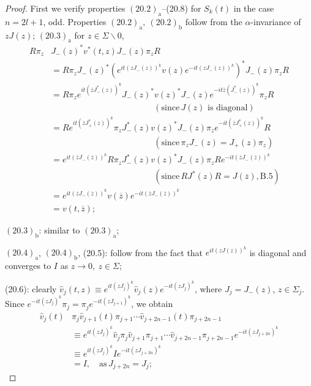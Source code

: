 \documentclass{surv-l}
\theoremstyle{plain}
\theoremstyle{definition}
\numberwithin{equation}{chapter}
\begin{document}
\begin{proof}
First we verify properties $(20.2)_{\mathrm{a}}$--(20.8) for $S_{k}(t)$ in the case $n= 2l+1$, odd. Properties $(20.2)_{\mathrm{a}},\ (20.2)_{\mathrm{b}}$ follow from the $\alpha$-invariance of $zJ(z)$; $(20.3)_{\mathrm{a}}$ for $z\in\Sigma\backslash 0$,
\begin{align*}
R\pi_{z}&J_{-}(z)^{*}v^{*}(t, z)J_{-}(z)\pi_{z}R\\
&=R\pi_{z}J_{-}(z)^{*}(e^{it(zJ_{-}(z))^{k}}v(z)e^{-it(zJ_{-}(z))^{k}})^{*}J_{-}(z)\pi_{z}R\\
&=R\pi_{z}e^{it(\overline{z}J^{*}_{-}(z))^{k}}J_{-}(z)^{*}v(z)^{*}J_{-}(z)e^{-it\overline{z}(J_{-}^{*}(z))^{k}}\pi_{z}R\\
&\qquad\qquad\qquad\qquad\qquad\qquad(\mathrm{since}\, J(z)\text{ is diagonal})\\
&=Re^{it(\overline{z}J_{+}^{*}(z))^{k}}\pi_{z}J_{-}^{*}(z)v(z)^{*}J_{-}(z)\pi_{z}e^{-it(\overline{z}J_{+}^{*}(z))^{k}}R\\
&\qquad\qquad\qquad\qquad\qquad\qquad(\mathrm{since}\, \pi_{z}J_{-}(z)=J_{+}(z)\pi_{z})\\
&=e^{it(\overline{z}J_{-}(\overline{z}))^{k}}R\pi_{z}J_{-}^{*}(z)v(z)^{*}J_{-}(z)\pi_{z}Re^{-it(\overline{z}J_{-}(\overline{z}))^{k}}\\
&\qquad\qquad\qquad\qquad\qquad\qquad(\mathrm{since}\, RJ^{*}(z)R=J(\overline{z}), \mathrm{B}.5)\\
&=e^{it(\overline{z}J_{-}(\overline{z}))^{k}}v(\overline{z})e^{-it(\overline{z}J_{-}(\overline{z}))^{k}}\\
&=v(t,\overline{z});
\end{align*}

$(20.3)_{\mathrm{b}}$: similar to $(20.3)_{\mathrm{a}}$;

$(20.4)_{\mathrm{a}}$, $(20.4)_{\mathrm{b}}$, (20.5): follow from the fact that $e^{it(zJ(z))^{k}}$ is diagonal and converges to $I$ as $z\rightarrow 0,\ z\in\Sigma$;

(20.6): clearly $\hat{v}_{j}(t, z)\equiv e^{it(zJ_{j})^{k}}\hat{v}_{j}(z)e^{-it(zJ_{j})^{k}}$, where $J_{j}=J_{-}(z)$, $z\in\Sigma_{j}$. Since $e^{-it(zJ_{j})^{k}}\pi_{j}=\pi_{j}e^{-it(zJ_{j+1})^{k}}$, we obtain
\begin{align*}
\hat{v}_{j}(t)&\pi_{j}\hat{v}_{j+1}(t)\pi_{j+1}\cdots\hat{v}_{j+2n-1}(t)\pi_{j+2n-1}\\
&\equiv e^{it(zJ_{j})^{k}}\hat{v}_{j}\pi_{j}\hat{v}_{j+1}\pi_{j+1}\cdots\hat{v}_{j+2n-1}\pi_{j+2n-1}e^{-it(zJ_{j+2n})^{k}}\\
&\equiv e^{it(zJ_{j})^{k}}Ie^{-it(zJ_{j+2n})^{k}}\\
&=I,\quad \mathrm{as}\, J_{j+2n}=J_{j};
\end{align*}


\end{proof}
\end{document}
